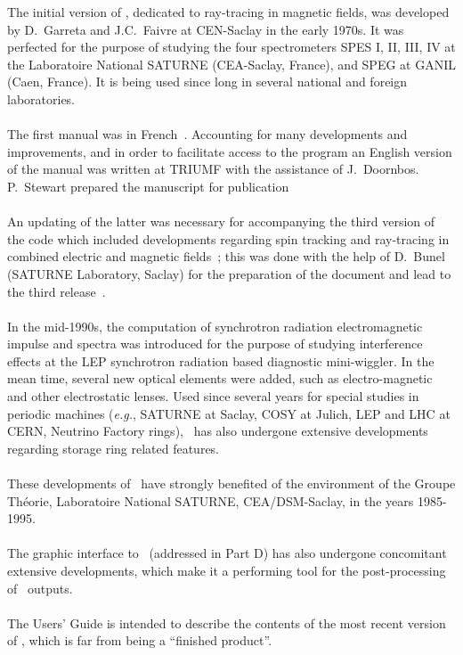 The initial  version of \zgoubi, dedicated to  ray-tracing in magnetic fields,
 was developed  by D.~Garreta and J.C.~Faivre  at CEN-Saclay in the early 1970s.
 It was perfected for the purpose of studying the four spectrometers SPES I, II, III, IV  
at the  Laboratoire National SATURNE (CEA-Saclay, France), and SPEG at GANIL 
(Caen, France). It is being used since long in several national and foreign laboratories.
\\
\\
\noindent The first manual was in French~\cite{Biblio1}. %
 Accounting for  many developments and improvements, and in order to facilitate access to 
the program an English version of the manual was written at TRIUMF with the assistance of 
J.~Doornbos. P.~Stewart prepared the manuscript for publication~\cite{Biblio2}%
\\
\\
\noindent  An updating of the latter was necessary for accompanying the third version of the code which included 
 developments regarding  spin tracking and ray-tracing in combined electric and magnetic fields~; 
 this was done with the help of 
D.~Bunel (SATURNE Laboratory, Saclay) for the preparation of the document and lead to the third 
release~\cite{Biblio2b}.
\\
\\
\noindent In the mid-1990s,  the computation of synchrotron radiation electromagnetic impulse and spectra 
was introduced for the purpose of studying interference effects at the LEP 
synchrotron radiation  based diagnostic mini-wiggler. In the mean 
time, several new optical elements were added, such as 
electro-magnetic and other electrostatic lenses. Used since several years for special studies in periodic
machines (\emph{e.g.}, SATURNE at Saclay, COSY at Julich, LEP and LHC at CERN, Neutrino Factory rings),  
\zgou\  has also undergone extensive developments regarding storage ring related features.
\\
\\
\noindent These  developments of \zgou\ 
 have strongly benefited of the environment of the Groupe Th\'eorie, 
Laboratoire National SATURNE, CEA/DSM-Saclay, in the years 1985-1995. 
\\
\\
The graphic  interface to \zgou\ (addressed in Part D) has also undergone concomitant extensive  
developments, which make it a performing tool for the post-processing of \zgou\  outputs.
\\
\\
\noindent  The Users' Guide is intended  to describe the contents of the most
recent version of \zgou, which is far from being a ``finished product''.




